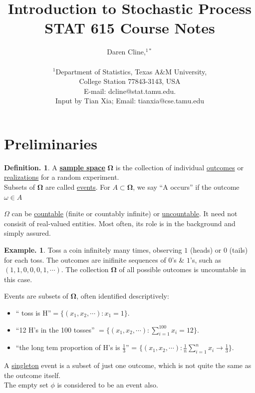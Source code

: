 \documentclass[12pt]{article}
\title{ Introduction to Stochastic Process\\ STAT 615 Course Notes}
\author
{Daren Cline,$^{1\ast}$\\
\\
\normalsize{$^{1}$Department of Statistics, Texas A\&M University,}\\
\normalsize{College Station 77843-3143, USA}\\
\normalsize{ E-mail:  dcline@stat.tamu.edu.}
\\
\normalsize{Input by Tian Xia; Email: tianxia@cse.tamu.edu}
}
\date{}
\newenvironment{sciabstract}{%
\begin{quote} \bf}
{\end{quote}}
\theoremstyle{definition}
\newtheorem{mydef}{Definition.}[section]
\newtheorem{myexp}{Example.}[section]
\theoremstyle{plain}
\begin{document}
 


\baselineskip24pt


\maketitle 




\begin{sciabstract}
 
\end{sciabstract}




\section{Preliminaries}
\begin{mydef}
A \underline{\textbf{sample space}} $\mathbf{\Omega}$ is the collection of individual \underline{outcomes} or \underline{realizations} for a random experiment. \\
Subsets of $\mathbf{\Omega}$ are called \underline{events}. For $A \subset \mathbf{\Omega}$, we say ``A occurs'' if the outcome $\omega \in A$ 
\end{mydef}

$\Omega$ can be \underline{countable} (finite or countably infinite) or \underline{uncountable}. It need not consisit of real-valued entities. Most often, its role is in the background and simply assured.

\begin{myexp}
Toss a coin infinitely many times, observing $1$ (heads) or $0$ (tails) for each toss. The outcomes are inifinite sequences of $0$'s \& $1$'s, such as $(1,1,0,0,0,1, \cdots)$. The collection $\mathbf{\Omega}$ of all possible outcomes is uncountable in this case.
\end{myexp}
Events are subsets of $\mathbf{\Omega}$, often identified descriptively:
\begin{itemize}
\item `` toss is H''$=\{(x_1, x_2, \cdots):x_1 = 1\}$.
\item ``12 H's in the  100 tosses''  $=\{(x_1, x_2, \cdots): \sum_{i=1}^100 x_i = 12\}$.
\item ``the long tem proportion of H's is $\frac{1}{3}$''  =  $\{(x_1, x_2, \cdots):\frac{1}{n}\sum_{i=1}^n x_i \rightarrow \frac{1}{3}\}$.
\end{itemize}
A \underline{singleton} event is a subset of just one outcome, which is not quite the same as the outcome itself. \\
The empty set $\phi$ is considered to be an event also.
\end{document}
